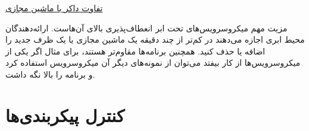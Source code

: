 \documentclass[a4paper,12pt]{book}
\begin{document}
\href{https://nickjanetakis.com/blog/comparing-virtual-machines-vs-docker-containers}
{ تفاوت داکر با ماشین مجازی}

\vskip 0.5cm
مزیت مهم میکروسرویس‌های تحت ابر انعطاف‌پذیری بالای آن‌هاست. ارائه‌دهندگان محیط ابری اجازه می‌دهند در کم‌تر از چند دقیقه یک ماشین مجازی یا یک ظرف جدید را اضافه یا حذف کنید. همچنین برنامه‌ها مقاوم‌تر هستند، برای مثال اگر یکی از میکروسرویس‌ها از کار بیفتد می‌توان از نمونه‌های دیگر آن میکروسرویس استفاده کرد و برنامه را بالا نگه داشت. 











\chapter{کنترل پیکربندی‌ها}




\begin{tcolorbox}[colback=red!5!white,colframe=red!75!black]
	
\end{tcolorbox}
\end{document}
